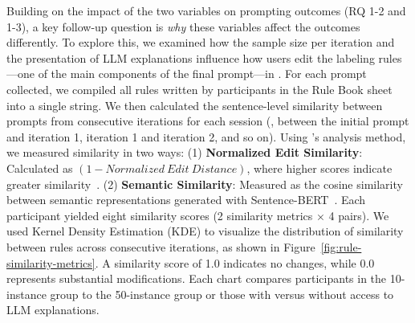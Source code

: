 Building on the impact of the two variables on prompting outcomes (RQ 1-2 and 1-3), a key follow-up question is \textit{why} these variables affect the outcomes differently. 
To explore this, we examined how the sample size per iteration and the presentation of LLM explanations influence how users edit the labeling rules---one of the main components of the final prompt---in \system.
For each prompt collected, we compiled all rules written by participants in the Rule Book sheet into a single string. 
We then calculated the sentence-level similarity between prompts from consecutive iterations for each session (\eg, between the initial prompt and iteration 1, iteration 1 and iteration 2, and so on).
Using \citet{huang2023ting}'s analysis method, we measured similarity in two ways:
(1) \textbf{Normalized Edit Similarity}: Calculated as $(1-Normalized~Edit~Distance)$,
where higher scores indicate greater similarity~\cite{yujian2007normalized, luozhouyang_python_similarity}.
(2) \textbf{Semantic Similarity}: Measured as the cosine similarity between semantic representations generated with Sentence-BERT~\cite{reimers-2019-sentence-bert}.
Each participant yielded eight similarity scores (2 similarity metrics $\times$ 4 pairs).
We used Kernel Density Estimation (KDE) to visualize the distribution of similarity between rules across consecutive iterations, as shown in Figure~\ref{fig:rule-similarity-metrics}. 
A similarity score of 1.0 indicates no changes, while 0.0 represents substantial modifications. 
Each chart compares participants in the 10-instance group to the 50-instance group or those with versus without access to LLM explanations.

